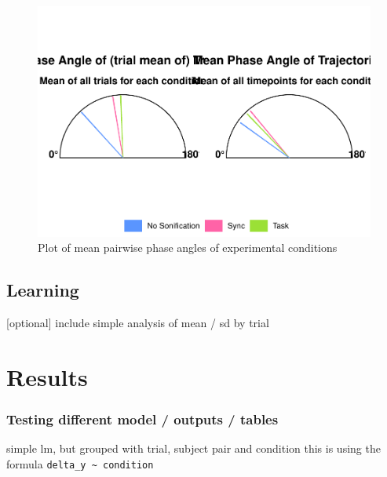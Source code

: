 \documentclass[10pt,a4paper,onecolumn]{article}
\begin{document}
\begin{figure}

{\centering \includegraphics[width=1\linewidth]{CogSci_Bachelor_Thesis_files/figure-latex/mean-instantaneous-phase-angle-circular-plot-3} 

}

\caption{Plot of mean pairwise phase angles of experimental conditions}\label{fig:mean-instantaneous-phase-angle-circular-plot-3}
\end{figure}

\hypertarget{learning}{%
\subsection{Learning}\label{learning}}

{[}optional{]} include simple analysis of mean / sd by trial

\hypertarget{results}{%
\section{Results}\label{results}}

\hypertarget{testing-different-model-outputs-tables}{%
\subsubsection{Testing different model / outputs / tables}\label{testing-different-model-outputs-tables}}

simple lm, but grouped with trial, subject pair and condition this is using the formula \texttt{delta\_y\ \textasciitilde{}\ condition}
\end{document}
